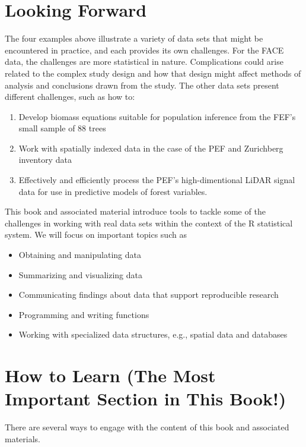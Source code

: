 \documentclass[]{krantz}
\providecommand{\tightlist}{%
  \setlength{\itemsep}{0pt}\setlength{\parskip}{0pt}}
\theoremstyle{definition}
\theoremstyle{definition}
\theoremstyle{definition}
\theoremstyle{remark}
\begin{document}
\section{Looking Forward}\label{looking-forward}

The four examples above illustrate a variety of data sets that might be
encountered in practice, and each provides its own challenges. For the
FACE data, the challenges are more statistical in nature. Complications
could arise related to the complex study design and how that design
might affect methods of analysis and conclusions drawn from the study.
The other data sets present different challenges, such as how to:

\begin{enumerate}
\def\labelenumi{\arabic{enumi}.}
\tightlist
\item
  Develop biomass equations suitable for population inference from the
  FEF's small sample of 88 trees
\item
  Work with spatially indexed data in the case of the PEF and Zurichberg
  inventory data
\item
  Effectively and efficiently process the PEF's high-dimentional LiDAR
  signal data for use in predictive models of forest variables.
\end{enumerate}

This book and associated material introduce tools to tackle some of the
challenges in working with real data sets within the context of the R
statistical system. We will focus on important topics such as

\begin{itemize}
\tightlist
\item
  Obtaining and manipulating data
\item
  Summarizing and visualizing data
\item
  Communicating findings about data that support reproducible research
\item
  Programming and writing functions
\item
  Working with specialized data structures, e.g., spatial data and
  databases
\end{itemize}

\section{How to Learn (The Most Important Section in This
Book!)}\label{how-to-learn-the-most-important-section-in-this-book}

There are several ways to engage with the content of this book and
associated materials.
\end{document}
